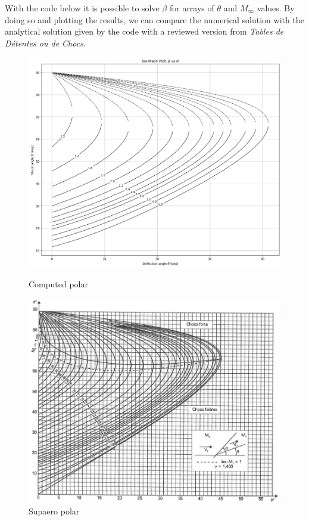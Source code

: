 With the code below it is possible to solve $\beta$ for arrays of \(\theta\) and \(M_\infty\) values. By doing so and plotting the results, we can compare the numerical solution with the analytical solution given by the code with a reviewed version from \textit{Tables de Détentes ou de Chocs}. ~\cite{Supaero}
\begin{figure}[H]
    \centering
    \begin{minipage}[b]{0.45\linewidth}
        \centering
        \includegraphics[width=\linewidth]{ressources/figures/compute_polaire.png}
		\caption{Computed polar}
    \end{minipage}
    \begin{minipage}[b]{0.45\linewidth}
        \centering
        \includegraphics[width=\linewidth]{ressources/figures/supaero_polar.jpg}
		\caption{Supaero polar}
    \end{minipage}
    \label{fig:polar_comparison}
\end{figure}

